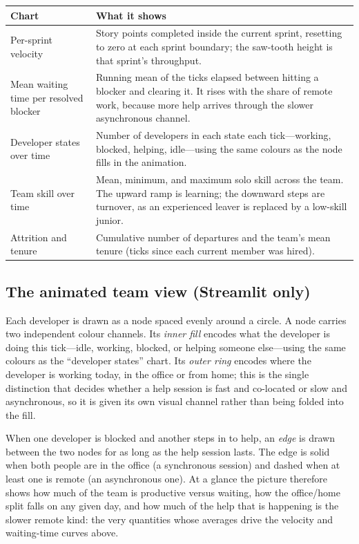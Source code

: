 \documentclass[11pt,a4paper]{article}
\begin{document}
\begin{center}
\begin{tabular}{p{4.6cm}p{10.4cm}}
\toprule
Chart & What it shows \\
\midrule
Per-sprint velocity & Story points completed inside the current sprint, resetting to zero at each sprint boundary; the saw-tooth height is that sprint's throughput. \\
Mean waiting time per resolved blocker & Running mean of the ticks elapsed between hitting a blocker and clearing it. It rises with the share of remote work, because more help arrives through the slower asynchronous channel. \\
Developer states over time & Number of developers in each state each tick---working, blocked, helping, idle---using the same colours as the node fills in the animation. \\
Team skill over time & Mean, minimum, and maximum solo skill across the team. The upward ramp is learning; the downward steps are turnover, as an experienced leaver is replaced by a low-skill junior. \\
Attrition and tenure & Cumulative number of departures and the team's mean tenure (ticks since each current member was hired). \\
\bottomrule
\end{tabular}
\end{center}

\subsection*{The animated team view (Streamlit only)}

Each developer is drawn as a node spaced evenly around a circle. A node carries two independent
colour channels. Its \emph{inner fill} encodes what the developer is doing this tick---idle,
working, blocked, or helping someone else---using the same colours as the ``developer states''
chart. Its \emph{outer ring} encodes where the developer is working today, in the office or from
home; this is the single distinction that decides whether a help session is fast and co-located or
slow and asynchronous, so it is given its own visual channel rather than being folded into the
fill.

When one developer is blocked and another steps in to help, an \emph{edge} is drawn between the two
nodes for as long as the help session lasts. The edge is solid when both people are in the office
(a synchronous session) and dashed when at least one is remote (an asynchronous one). At a glance
the picture therefore shows how much of the team is productive versus waiting, how the office/home
split falls on any given day, and how much of the help that is happening is the slower remote kind:
the very quantities whose averages drive the velocity and waiting-time curves above.
\end{document}
